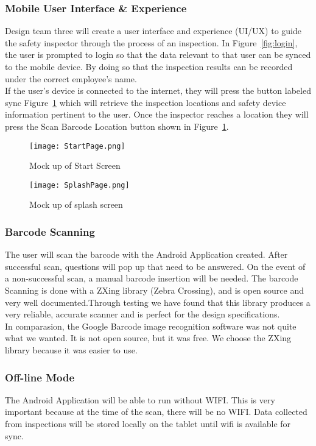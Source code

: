 \documentclass[Letter,11pt]{article}
\begin{document}
	\subsubsection{Mobile User Interface \& Experience}
	Design team three will create a user interface and experience (UI/UX) to guide the safety inspector through the process of an inspection. In  Figure~\ref{fig:login}, the user is prompted to login so that the data relevant to that user can be synced to the mobile device. By doing so that the inspection results can be recorded under the correct employee's name. \\
	If the user's device is connected to the internet, they will press the button labeled sync Figure~\ref{fig:splash} which will retrieve the inspection locations and safety device information pertinent to the user.
	Once the inspector reaches a location they will press the Scan Barcode Location button shown in Figure~\ref{fig:splash}.
	\begin{figure}[h]

		\begin{minipage}{0.5\textwidth}
			\centering
			\texttt{[image: StartPage.png]}
			\caption{\label{fig:login}Mock up of Start Screen}
		\end{minipage}%
		\begin{minipage}{0.5\textwidth}
			\centering
			\texttt{[image: SplashPage.png]}
			\caption{\label{fig:splash}Mock up of splash screen}
		\end{minipage}
	\end{figure}

	\subsubsection{Barcode Scanning}
	The user will scan the barcode with the Android Application created. After successful scan, questions will pop up that need to be answered. On the event of a non-successful scan, a manual barcode insertion will be needed. The barcode Scanning is done with a ZXing library (Zebra Crossing), and is open source and very well documented.Through testing we have found that this library produces a very reliable, accurate scanner and is perfect for the design specifications.\\
	In comparasion, the Google Barcode  image recognition software was not quite what we wanted. It is not open source, but it was free. We choose the ZXing library because it was easier to use.
	\subsubsection{Off-line Mode}
	The Android Application will be able to run without WIFI. This is very important because at the time of the scan, there will be no WIFI. Data collected from inspections will be stored locally on the tablet until wifi is available for sync. 
\end{document}

